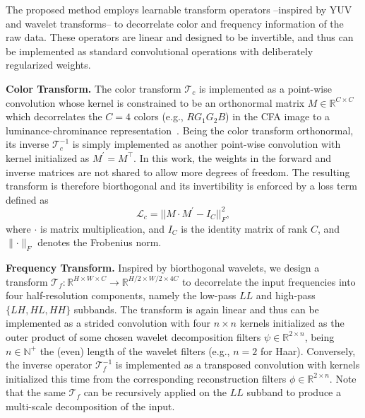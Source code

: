 \documentclass[final]{cvpr}
\begin{document}
    The proposed method employs learnable transform operators --inspired by YUV and wavelet transforms-- to decorrelate color and frequency information of the raw data. These operators are linear and designed to be invertible, and thus can be implemented as standard convolutional operations with deliberately regularized weights.
    
    \textbf{Color Transform.} The color transform $\mathcal{T}_c$ is implemented as a point-wise convolution whose kernel is constrained to be an orthonormal matrix $M \in \mathbb{R}^{C \times C}$ which decorrelates the $C=4$ colors (e.g., $RG_1G_2B$) in the CFA image to a luminance-chrominance representation~\cite{buades2020cfa}. Being the color transform orthonormal, its inverse $\mathcal{T}^{-1}_c$ is simply implemented as another point-wise convolution with kernel initialized as $M^\prime = M^\top$. In this work, the weights in the forward and inverse matrices are not shared to allow more degrees of freedom. The resulting transform is therefore biorthogonal and its invertibility is enforced by a loss term defined as
    \begin{equation}
        \mathcal{L}_c = \big\lvert\big\lvert M \cdot M^\prime - I_C \big\rvert\big\rvert_F^2,
        \label{eq:color_loss}
    \end{equation}
    where $\cdot$ is matrix multiplication, and $I_C$ is the identity matrix of rank $C$, and $\parallel\cdot\parallel_F$ denotes the Frobenius norm.
    
    \textbf{Frequency Transform.} Inspired by biorthogonal wavelets, we design a transform $\mathcal{T}_f : \mathbb{R}^{H \times W \times C} \rightarrow \mathbb{R}^{H/2 \times W/2 \times 4C}$ to decorrelate the input frequencies into four half-resolution components, namely the low-pass $LL$ and high-pass $\{LH, HL, HH\}$ subbands. The transform is again linear and thus can be implemented as a strided convolution with four $n \times n$ kernels initialized as the outer product of some chosen wavelet decomposition filters $\psi \in \mathbb{R}^{2 \times n}$, being $n \in \mathbb{N}^+$ the (even) length of the wavelet filters (e.g., $n=2$ for Haar). Conversely, the inverse operator $\mathcal{T}^{-1}_f$ is implemented as a transposed convolution with kernels initialized this time from the corresponding reconstruction filters $\phi \in \mathbb{R}^{2 \times n}$. Note that the same $\mathcal{T}_f$ can be recursively applied on the $LL$ subband to produce a multi-scale decomposition of the input.
\end{document}
